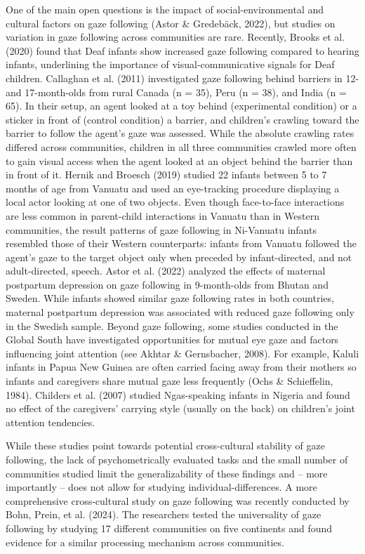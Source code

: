\documentclass[
  man,floatsintext]{apa7}
\begin{document}
One of the main open questions is the impact of social-environmental and cultural factors on gaze following (Astor \& Gredebäck, 2022), but studies on variation in gaze following across communities are rare.
Recently, Brooks et al. (2020) found that Deaf infants show increased gaze following compared to hearing infants, underlining the importance of visual-communicative signals for Deaf children.
Callaghan et al. (2011) investigated gaze following behind barriers in 12- and 17-month-olds from rural Canada (n = 35), Peru (n = 38), and India (n = 65).
In their setup, an agent looked at a toy behind (experimental condition) or a sticker in front of (control condition) a barrier, and children's crawling toward the barrier to follow the agent's gaze was assessed.
While the absolute crawling rates differed across communities, children in all three communities crawled more often to gain visual access when the agent looked at an object behind the barrier than in front of it.
Hernik and Broesch (2019) studied 22 infants between 5 to 7 months of age from Vanuatu and used an eye-tracking procedure displaying a local actor looking at one of two objects.
Even though face-to-face interactions are less common in parent-child interactions in Vanuatu than in Western communities, the result patterns of gaze following in Ni-Vanuatu infants resembled those of their Western counterparts: infants from Vanuatu followed the agent's gaze to the target object only when preceded by infant-directed, and not adult-directed, speech.
Astor et al. (2022) analyzed the effects of maternal postpartum depression on gaze following in 9-month-olds from Bhutan and Sweden. While infants showed similar gaze following rates in both countries, maternal postpartum depression was associated with reduced gaze following only in the Swedish sample.
Beyond gaze following, some studies conducted in the Global South have investigated opportunities for mutual eye gaze and factors influencing joint attention (see Akhtar \& Gernsbacher, 2008).
For example, Kaluli infants in Papua New Guinea are often carried facing away from their mothers so infants and caregivers share mutual gaze less frequently (Ochs \& Schieffelin, 1984). Childers et al. (2007) studied Ngas-speaking infants in Nigeria and found no effect of the caregivers' carrying style (usually on the back) on children's joint attention tendencies.

While these studies point towards potential cross-cultural stability of gaze following, the lack of psychometrically evaluated tasks and the small number of communities studied limit the generalizability of these findings and -- more importantly -- does not allow for studying individual-differences.
A more comprehensive cross-cultural study on gaze following was recently conducted by Bohn, Prein, et al. (2024). The researchers tested the universality of gaze following by studying 17 different communities on five continents and found evidence for a similar processing mechanism across communities.
\end{document}
